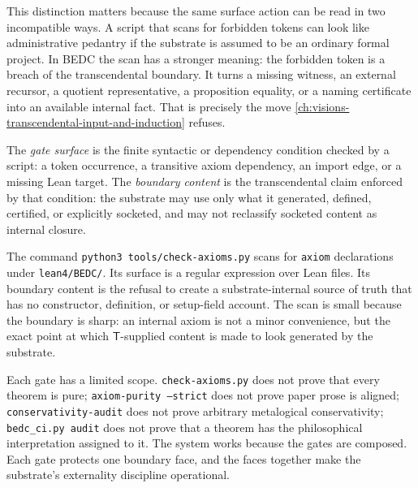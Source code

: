 This distinction matters because the same surface action can be read in two incompatible ways. A script that scans for forbidden tokens can look like administrative pedantry if the substrate is assumed to be an ordinary formal project. In BEDC the scan has a stronger meaning: the forbidden token is a breach of the transcendental boundary. It turns a missing witness, an external recursor, a quotient representative, a proposition equality, or a naming certificate into an available internal fact. That is precisely the move \autoref{ch:visions-transcendental-input-and-induction} refuses.

\begin{definition}
\label{def:audit-gates-surface-content}
The \emph{gate surface} is the finite syntactic or dependency condition checked by a script: a token occurrence, a transitive axiom dependency, an import edge, or a missing Lean target. The \emph{boundary content} is the transcendental claim enforced by that condition: the substrate may use only what it generated, defined, certified, or explicitly socketed, and may not reclassify socketed content as internal closure.
\end{definition}

\begin{example}
\label{ex:audit-gates-token-scan-load}
The command \texttt{python3 tools/check-axioms.py} scans for \texttt{axiom} declarations under \texttt{lean4/BEDC/}. Its surface is a regular expression over Lean files. Its boundary content is the refusal to create a substrate-internal source of truth that has no constructor, definition, or setup-field account. The scan is small because the boundary is sharp: an internal axiom is not a minor convenience, but the exact point at which $\mathsf{T}$-supplied content is made to look generated by the substrate.
\end{example}

\begin{remark}
\label{rem:audit-gates-pass-local}
Each gate has a limited scope. \texttt{check-axioms.py} does not prove that every theorem is pure; \texttt{axiom-purity --strict} does not prove paper prose is aligned; \texttt{conservativity-audit} does not prove arbitrary metalogical conservativity; \texttt{bedc\_ci.py audit} does not prove that a theorem has the philosophical interpretation assigned to it. The system works because the gates are composed. Each gate protects one boundary face, and the faces together make the substrate's externality discipline operational.
\end{remark}

